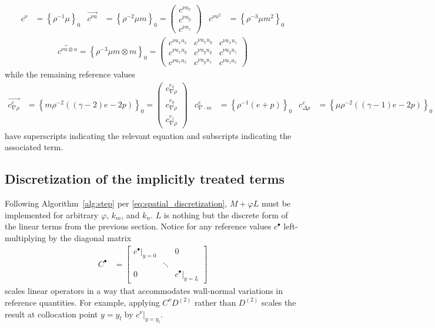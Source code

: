 \documentclass[letterpaper,11pt,nointlimits,reqno,draft]{amsbook}
\newcommand{\reference}[1]{\ensuremath{\left\{#1\right\}_{0}}}
\begin{document}
\begin{align}
  c^{\nu} &= \reference{\rho^{-1}\mu}
&
  \overrightarrow{c^{\nu{}u}} &= \reference{\rho^{-2}\mu{}m}
  = \begin{pmatrix} c^{\nu{}u_x} \\ c^{\nu{}u_y} \\ c^{\nu{}u_z} \end{pmatrix}
&
  c^{\nu{}u^2} &= \reference{\rho^{-3}\mu{}m^2}
\end{align}
\begin{align}
   \overleftrightarrow{c^{\nu{}u\otimes{}u}}
  = \reference{\rho^{-3}\mu{}m\otimes{}m}
  = \begin{pmatrix}
   c^{\nu{} u_x u_x} & c^{\nu{} u_x u_y} & c^{\nu{} u_x u_z} \\
   c^{\nu{} u_x u_y} & c^{\nu{} u_y u_y} & c^{\nu{} u_y u_z} \\
   c^{\nu{} u_x u_z} & c^{\nu{} u_y u_z} & c^{\nu{} u_z u_z}
  \end{pmatrix}
\end{align}
while the remaining reference values
\begin{align}
  \overrightarrow{c^{e}_{\nabla\rho}} &= \reference{
        m\rho^{-2}\left(\left(\gamma-2\right)e-2p\right)
  }
  = \begin{pmatrix}
      c^{e_{x}}_{\nabla\rho} \\
      c^{e_{y}}_{\nabla\rho} \\
      c^{e_{z}}_{\nabla\rho}
  \end{pmatrix}
&
  c^{e}_{\nabla\cdot{}m} &= \reference{
        \rho^{-1}\left(e + p\right)
  }
&
  c^{e}_{\Delta\rho} &= \reference{
        \mu\rho^{-2}\left(\left(\gamma-1\right)e-2p\right)
  }
\end{align}
have superscripts indicating the relevant equation and
subscripts indicating the associated term.

\subsection{Discretization of the implicitly treated terms}
\label{sec:discretizationofimplicitterms}
Following Algorithm~\ref{alg:step} per \eqref{eq:spatial_discretization},
$M+\varphi{}L$ must be implemented for arbitrary $\varphi$, $k_m$, and $k_n$.
$L$ is nothing but the discrete form of the linear terms from the previous
section.  Notice for any reference values $c^{\bullet}$ left-multiplying by
the diagonal matrix
\begin{align}
  C^{\bullet} &= \begin{bmatrix}
   \left.c^{\bullet}\right|_{y=0} &        & 0 \\
                                  & \ddots &    \\
   0                              &        & \left.c^{\bullet}\right|_{y=L}
   \end{bmatrix}
\end{align}
scales linear operators in a way that accommodates wall-normal variations in
reference quantities.  For example, applying $C^{\nu}D^{(2)}$ rather than
$D^{(2)}$ scales the result at collocation point $y=y_l$ by
$\left.c^{\nu}\right|_{y=y_l}$.
\end{document}
